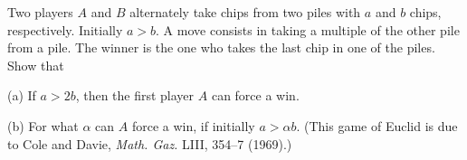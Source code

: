 Two players $A$ and $B$ alternately take chips from two piles with $a$ and $b$ chips, respectively. Initially $a > b$. A move consists in taking a multiple of the other pile from a pile. The winner is the one who takes the last chip in one of the piles. Show that

(a) If $a > 2b$, then the first player $A$ can force a win.

(b) For what $\alpha$ can $A$ force a win, if initially $a > \alpha b$. (This game of Euclid is due to Cole and Davie, \emph{Math. Gaz.} LIII, 354--7 (1969).)
